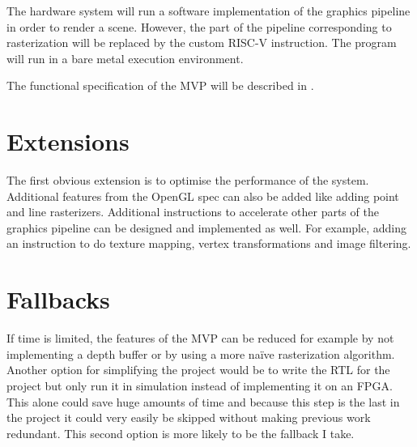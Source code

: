 The hardware system will run a software implementation of the graphics pipeline in order to render a scene. However, the part of the pipeline corresponding to rasterization will be replaced by the custom RISC-V instruction. The program will run in a bare metal execution environment.

The functional specification of the MVP will be described in .

\section{Extensions}
The first obvious extension is to optimise the performance of the system. 
Additional features from the OpenGL spec can also be added like adding point and line rasterizers.
Additional instructions to accelerate other parts of the graphics pipeline can be designed and implemented as well. For example, adding an instruction to do texture mapping, vertex transformations and image filtering.

\section{Fallbacks}
If time is limited, the features of the MVP can be reduced for example by not implementing a depth buffer or by using a more naïve rasterization algorithm. 
Another option for simplifying the project would be to write the RTL for the project but only run it in simulation instead of implementing it on an FPGA. This alone could save huge amounts of time and because this step is the last in the project it could very easily be skipped without making previous work redundant.
This second option is more likely to be the fallback I take.
